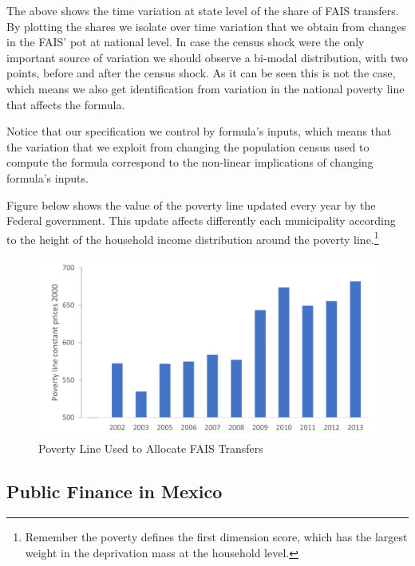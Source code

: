 \documentclass[dv_diss_main.tex]{subfiles}
\begin{document}
The above shows the time variation at state level of the share of FAIS transfers. By plotting the shares we isolate over time variation that we obtain from changes in the FAIS' pot at national level. In case the census shock were the only important source of variation we should observe a bi-modal distribution, with two points, before and after the census shock. As it can be seen this is not the case, which means we also get identification from variation in the national poverty line that affects the formula.

Notice that our specification we control by formula's inputs, which means that the variation that we exploit from changing the population census used to compute the formula correspond to the non-linear implications of changing formula's inputs. 

Figure below shows the value of the poverty line updated every year by the Federal government. This update affects differently each municipality according to the height of the household income distribution around the poverty line.\footnote{ Remember the poverty defines the first dimension score, which has the largest weight in the deprivation mass at the household level.} 

\begin{figure}[H] 
	\centering 
	
		\centering
		\includegraphics[width=\linewidth]{figures/Poverty_line.png}
		\vspace{0.1cm}
		\caption{Poverty Line Used to Allocate FAIS Transfers}\label{fig:B2}
		
		\parbox{\textwidth}{\small 
		\vspace{2eX}
		\footnotesize	
		\povertylineformula 
		}
	
\end{figure}

\newpage
\subsection{Public Finance in Mexico}
    
\end{document}
